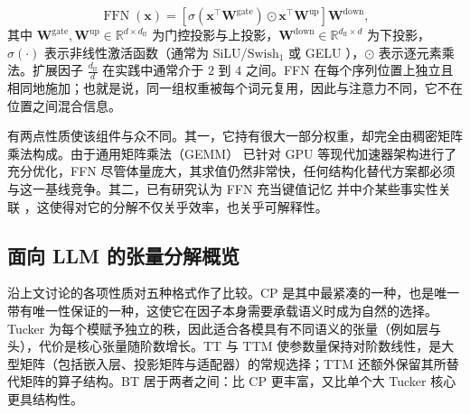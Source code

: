 \documentclass[11pt]{article}
\newcommand{\R}{\mathbb{R}}
\newcommand{\mat}[1]{\mathbf{#1}}
\newcommand{\vecb}[1]{\mathbf{#1}}
\begin{document}
\begin{equation}
\operatorname{FFN}(\vecb{x}) = \left[ \sigma(\vecb{x}^\top \mat{W}^{\text{gate}}) \odot \vecb{x}^\top \mat{W}^{\text{up}} \right] \mat{W}^{\text{down}},
\label{eq:ffn_gated}
\end{equation}
其中 $\mat{W}^{\text{gate}}, \mat{W}^{\text{up}} \in \R^{d \times d_{\text{ff}}}$ 为门控投影与上投影，$\mat{W}^{\text{down}} \in \R^{d_{\text{ff}} \times d}$ 为下投影，$\sigma(\cdot)$ 表示非线性激活函数（通常为 SiLU/$\text{Swish}_1$ \cite{ramachandran2017swish} 或 GELU \cite{hendrycks2023gelu}），$\odot$ 表示逐元素乘法。扩展因子 $\frac{d_{\text{ff}}}{d}$ 在实践中通常介于 $2$ 到 $4$ 之间。FFN 在每个序列位置上独立且相同地施加；也就是说，同一组权重被每个词元复用，因此与注意力不同，它不在位置之间混合信息。

有两点性质使该组件与众不同。其一，它持有很大一部分权重，却完全由稠密矩阵乘法构成。由于通用矩阵乘法（GEMM）\cite{goto2008anatomy} 已针对 GPU 等现代加速器架构进行了充分优化，FFN 尽管体量庞大，其求值仍然非常快，任何结构化替代方案都必须与这一基线竞争。其二，已有研究认为 FFN 充当键值记忆 \cite{geva2021ffnmemory} 并中介某些事实性关联 \cite{meng2023ffnfactuallocation}，这使得对它的分解不仅关乎效率，也关乎可解释性。


\subsection{面向 LLM 的张量分解概览}

 沿上文讨论的各项性质对五种格式作了比较。CP 是其中最紧凑的一种，也是唯一带有唯一性保证的一种，这使它在因子本身需要承载语义时成为自然的选择。Tucker 为每个模赋予独立的秩，因此适合各模具有不同语义的张量（例如层与头），代价是核心张量随阶数增长。TT 与 TTM 使参数量保持对阶数线性，是大型矩阵（包括嵌入层、投影矩阵与适配器）的常规选择；TTM 还额外保留其所替代矩阵的算子结构。BT 居于两者之间：比 CP 更丰富，又比单个大 Tucker 核心更具结构性。
\end{document}
